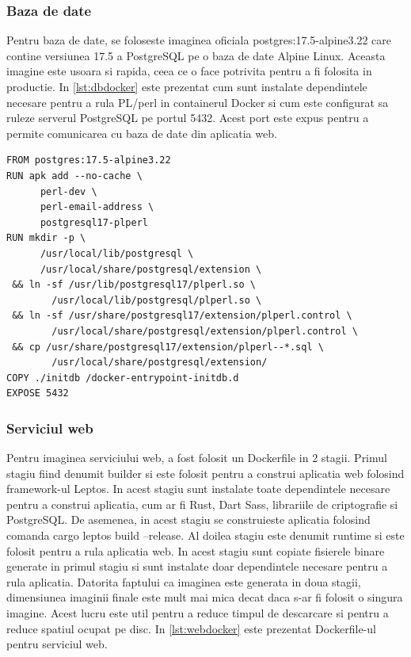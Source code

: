 \documentclass[titlepage,12pt]{article}
\DeclareRobustCommand{\code}[1]{{\ttfamily\small #1}}
\begin{document}
\subsubsection{Baza de date}
Pentru baza de date, se foloseste imaginea oficiala \code{postgres:17.5-alpine3.22} care contine versiunea 17.5 a PostgreSQL pe o baza de date Alpine Linux. Aceasta imagine este usoara si rapida, ceea ce o face potrivita pentru a fi folosita in productie. In \cref{lst:dbdocker} este prezentat cum sunt instalate dependintele necesare pentru a rula \code{PL/perl} in containerul Docker si cum este configurat sa ruleze serverul PostgreSQL pe portul 5432. Acest port este expus pentru a permite comunicarea cu baza de date din aplicatia web.

\begin{lstlisting}[language=docker,caption={Dockerfile pentru baza de date},label={lst:dbdocker}]
FROM postgres:17.5-alpine3.22
RUN apk add --no-cache \
      perl-dev \
      perl-email-address \
      postgresql17-plperl
RUN mkdir -p \
      /usr/local/lib/postgresql \
      /usr/local/share/postgresql/extension \
 && ln -sf /usr/lib/postgresql17/plperl.so \
        /usr/local/lib/postgresql/plperl.so \
 && ln -sf /usr/share/postgresql17/extension/plperl.control \
        /usr/local/share/postgresql/extension/plperl.control \
 && cp /usr/share/postgresql17/extension/plperl--*.sql \
        /usr/local/share/postgresql/extension/
COPY ./initdb /docker-entrypoint-initdb.d
EXPOSE 5432
\end{lstlisting}

\subsubsection{Serviciul web}

Pentru imaginea serviciului web, a fost folosit un Dockerfile in 2 stagii. Primul stagiu fiind denumit \code{builder} si este folosit pentru a construi aplicatia web folosind framework-ul Leptos. In acest stagiu sunt instalate toate dependintele necesare pentru a construi aplicatia, cum ar fi Rust, Dart Sass, librariile de criptografie si PostgreSQL. De asemenea, in acest stagiu se construieste aplicatia folosind comanda \code{cargo leptos build --release}. Al doilea stagiu este denumit \code{runtime} si este folosit pentru a rula aplicatia web. In acest stagiu sunt copiate fisierele binare generate in primul stagiu si sunt instalate doar dependintele necesare pentru a rula aplicatia. Datorita faptului ca imaginea este generata in doua stagii, dimensiunea imaginii finale este mult mai mica decat daca s-ar fi folosit o singura imagine. Acest lucru este util pentru a reduce timpul de descarcare si pentru a reduce spatiul ocupat pe disc. In \cref{lst:webdocker} este prezentat Dockerfile-ul pentru serviciul web.
\end{document}

